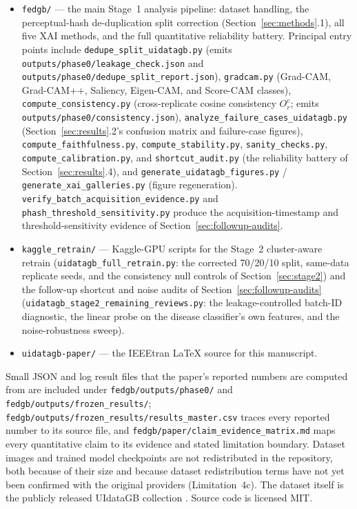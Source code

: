 \begin{itemize}
\item \texttt{fedgb/} --- the main Stage~1 analysis pipeline: dataset handling, the perceptual-hash de-duplication split correction (Section~\ref{sec:methods}.1), all five XAI methods, and the full quantitative reliability battery. Principal entry points include \texttt{dedupe\_split\_uidatagb.py} (emits \texttt{outputs/phase0/leakage\_check.json} and \texttt{outputs/phase0/dedupe\_split\_report.json}), \texttt{gradcam.py} (Grad-CAM, Grad-CAM++, Saliency, Eigen-CAM, and Score-CAM classes), \texttt{compute\_consistency.py} (cross-replicate cosine consistency $O_r^c$; emits \texttt{outputs/phase0/consistency.json}), \texttt{analyze\_failure\_cases\_uidatagb.py} (Section~\ref{sec:results}.2's confusion matrix and failure-case figures), \texttt{compute\_faithfulness.py}, \texttt{compute\_stability.py}, \texttt{sanity\_checks.py}, \texttt{compute\_calibration.py}, and \texttt{shortcut\_audit.py} (the reliability battery of Section~\ref{sec:results}.4), and \texttt{generate\_uidatagb\_figures.py} / \texttt{generate\_xai\_galleries.py} (figure regeneration). \texttt{verify\_batch\_acquisition\_evidence.py} and \texttt{phash\_threshold\_sensitivity.py} produce the acquisition-timestamp and threshold-sensitivity evidence of Section~\ref{sec:followup-audits}.
\item \texttt{kaggle\_retrain/} --- Kaggle-GPU scripts for the Stage~2 cluster-aware retrain (\texttt{uidatagb\_full\_retrain.py}: the corrected 70/20/10 split, same-data replicate seeds, and the consistency null controls of Section~\ref{sec:stage2}) and the follow-up shortcut and noise audits of Section~\ref{sec:followup-audits} (\texttt{uidatagb\_stage2\_remaining\_reviews.py}: the leakage-controlled batch-ID diagnostic, the linear probe on the disease classifier's own features, and the noise-robustness sweep).
\item \texttt{uidatagb-paper/} --- the IEEEtran LaTeX source for this manuscript.
\end{itemize}

Small JSON and log result files that the paper's reported numbers are computed from are included under \texttt{fedgb/outputs/phase0/} and \texttt{fedgb/outputs/frozen\_results/}; \texttt{fedgb/outputs/frozen\_results/results\_master.csv} traces every reported number to its source file, and \texttt{fedgb/paper/claim\_evidence\_matrix.md} maps every quantitative claim to its evidence and stated limitation boundary. Dataset images and trained model checkpoints are not redistributed in the repository, both because of their size and because dataset redistribution terms have not yet been confirmed with the original providers (Limitation~4c). The dataset itself is the publicly released UIdataGB collection \cite{ref17}. Source code is licensed MIT.

